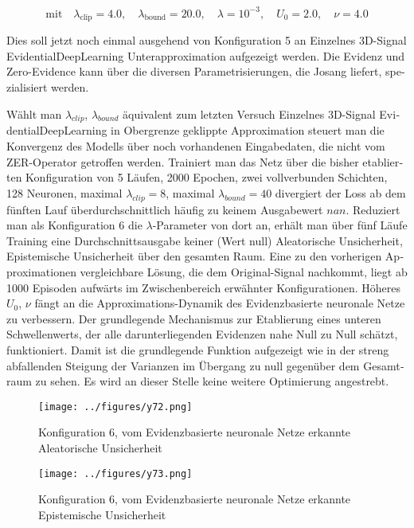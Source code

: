 \begin{otherlanguage}{ngerman}
\[
\text{mit} \quad 
\lambda_{\text{clip}} = 4.0, \quad
\lambda_{\text{bound}} = 20.0, \quad
\lambda = 10^{-3}, \quad
U_0 = 2.0, \quad
\nu = 4.0
\]

Dies soll jetzt noch einmal ausgehend von Konfiguration 5 an \glqq{}Einzelnes 3D-Signal \gls{EvidentialDeepLearning} Unterapproximation\grqq{} aufgezeigt werden. Die Evidenz und \glqq{}Zero-Evidence\grqq{} kann über die diversen Parametrisierungen, die Josang liefert, spezialisiert werden.  

Wählt man $\lambda_{clip}$, $\lambda_{bound}$ äquivalent zum letzten Versuch \glqq{}Einzelnes 3D-Signal \gls{EvidentialDeepLearning} in Obergrenze geklippte Approximation\grqq{} steuert man die Konvergenz des Modells über noch vorhandenen Eingabedaten, die nicht vom ZER-Operator getroffen werden. Trainiert man das Netz über die bisher etablierten Konfiguration von 5 Läufen, 2000 Epochen, zwei vollverbunden Schichten, 128 Neuronen, maximal $\lambda_{clip}=8$, maximal $\lambda_{bound}=40$ divergiert der Loss ab dem fünften Lauf überdurchschnittlich häufig zu keinem Ausgabewert $nan$. Reduziert man als Konfiguration 6 die $\lambda$-Parameter von dort an, erhält man über fünf Läufe Training eine Durchschnittsausgabe keiner (Wert \glqq{}null\grqq{}) \gls{Aleatorische Unsicherheit}, \gls{Epistemische Unsicherheit} über den gesamten Raum. Eine zu den vorherigen Approximationen vergleichbare Lösung, die dem Original-Signal nachkommt, liegt ab 1000 Episoden aufwärts im Zwischenbereich erwähnter Konfigurationen. Höheres $U_{0}$, $\nu$ fängt an die Approximations-Dynamik des \gls{Evidenzbasierte neuronale Netze} zu verbessern. Der grundlegende Mechanismus zur Etablierung eines unteren Schwellenwerts, der alle darunterliegenden Evidenzen nahe Null zu Null schätzt, funktioniert. Damit ist die grundlegende Funktion aufgezeigt wie in der streng abfallenden Steigung der Varianzen im Übergang zu null gegenüber dem Gesamtraum zu sehen. Es wird an dieser Stelle keine weitere Optimierung angestrebt.  



\begin{figure}[!ht]
  \centering

  \begin{minipage}[t]{0.49\textwidth}
    \centering
    \texttt{[image: ../figures/y72.png]}
    \captionsetup{justification=raggedright,singlelinecheck=false}
    \caption*{Konfiguration 6, vom \gls{Evidenzbasierte neuronale Netze} erkannte \gls{Aleatorische Unsicherheit}}
    \label{fig:bild32}
  \end{minipage}%
  \hfill
  \begin{minipage}[t]{0.49\textwidth}
    \centering
    \texttt{[image: ../figures/y73.png]}
    \captionsetup{justification=raggedright,singlelinecheck=false}
    \caption*{Konfiguration 6, vom \gls{Evidenzbasierte neuronale Netze} erkannte \gls{Epistemische Unsicherheit}}
    \label{fig:bild33}
  \end{minipage}


\end{figure}
\end{otherlanguage}
